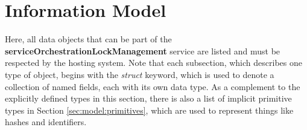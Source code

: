 \documentclass[a4paper]{arrowhead}
\begin{document}
\clearpage

\section{Information Model}
\label{sec:model}

Here, all data objects that can be part of the \textbf{serviceOrchestrationLockManagement} service are listed and must be respected by the hosting system.
Note that each subsection, which describes one type of object, begins with the \textit{struct} keyword, which is used to denote a collection of named fields, each with its own data type.
As a complement to the explicitly defined types in this section, there is also a list of implicit primitive types in Section \ref{sec:model:primitives}, which are used to represent things like hashes and identifiers.


\end{document}
